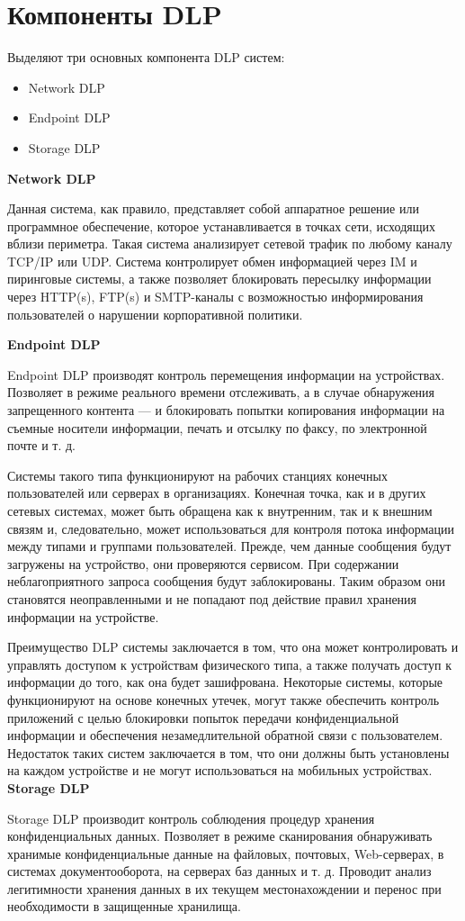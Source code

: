\section{Компоненты DLP}

Выделяют три основных компонента DLP систем:

\begin{itemize}
	\item
	    Network DLP
	\item 
	    Endpoint DLP
	\item 
	    Storage DLP
	    
\end{itemize}

\textbf{Network DLP}

Данная система, как правило, представляет собой аппаратное решение или программное обеспечение, которое устанавливается в точках сети, исходящих вблизи периметра. Такая система анализирует сетевой трафик по любому каналу TCP/IP или UDP. Система контролирует обмен информацией через IM и пиринговые системы, а также позволяет блокировать пересылку информации через HTTP(s), FTP(s) и SMTP-каналы с возможностью информирования пользователей о нарушении корпоративной политики.

\textbf{Endpoint DLP}

Endpoint DLP производят контроль перемещения информации на устройствах. Позволяет в режиме реального времени отслеживать, а в случае обнаружения запрещенного контента — и блокировать попытки копирования информации на съемные носители информации, печать и отсылку по факсу, по электронной почте и т. д.

Системы такого типа функционируют на рабочих станциях конечных пользователей или серверах в организациях. Конечная точка, как и в других сетевых системах, может быть обращена как к внутренним, так и к внешним связям и, следовательно, может использоваться для контроля потока информации между типами и группами пользователей. Прежде, чем данные сообщения будут загружены на устройство, они проверяются сервисом. При содержании неблагоприятного запроса сообщения будут заблокированы. Таким образом они становятся неоправленными и не попадают под действие правил хранения информации на устройстве.

Преимущество DLP системы заключается в том, что она может контролировать и управлять доступом к устройствам физического типа, а также получать доступ к информации до того, как она будет зашифрована. Некоторые системы, которые функционируют на основе конечных утечек, могут также обеспечить контроль приложений с целью блокировки попыток передачи конфиденциальной информации и обеспечения незамедлительной обратной связи с пользователем. Недостаток таких систем заключается в том, что они должны быть установлены на каждом устройстве и не могут использоваться на мобильных устройствах. 
\textbf{Storage DLP}

Storage DLP производит контроль соблюдения процедур хранения конфиденциальных данных. Позволяет в режиме сканирования обнаруживать хранимые конфиденциальные данные на файловых, почтовых, Web-серверах, в системах документооборота, на серверах баз данных и т. д. Проводит анализ легитимности хранения данных в их текущем местонахождении и перенос при необходимости в защищенные хранилища.